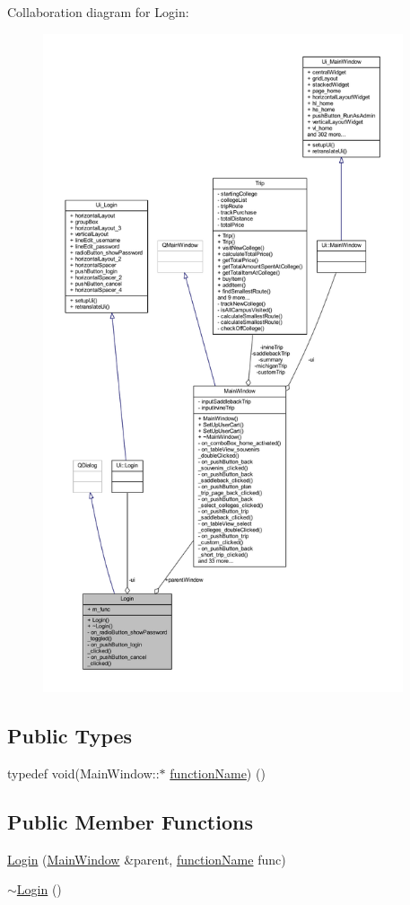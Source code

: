 Collaboration diagram for Login\+:
\nopagebreak
\begin{figure}[H]
\begin{center}
\leavevmode
\includegraphics[height=550pt]{class_login__coll__graph}
\end{center}
\end{figure}
\subsection*{Public Types}
\begin{DoxyCompactItemize}
\item 
typedef void(Main\+Window\+::$\ast$ \hyperlink{class_login_a05d702e414775468b6dddb9f69f4663b}{function\+Name}) ()
\end{DoxyCompactItemize}
\subsection*{Public Member Functions}
\begin{DoxyCompactItemize}
\item 
\hyperlink{class_login_a6875606efe575cfe250d5780fb79c0f4}{Login} (\hyperlink{class_main_window}{Main\+Window} \&parent, \hyperlink{class_login_a05d702e414775468b6dddb9f69f4663b}{function\+Name} func)
\item 
\hyperlink{class_login_a659bc7233ec12c79b9fa523c1734fbbc}{$\sim$\+Login} ()
\end{DoxyCompactItemize}
